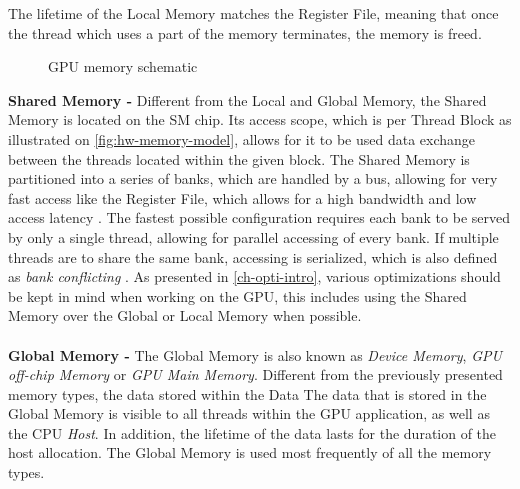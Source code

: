 The lifetime of the Local Memory matches the Register File, meaning that once the thread which uses a part of the memory terminates, the memory is freed.
\begin{figure}[H]
	\centering
	\caption{GPU memory schematic}
	\label{fig:hw-memory-schematic}
\end{figure}
\noindent \textbf{Shared Memory -} Different from the Local and Global Memory, the Shared Memory is located on the SM chip.
Its access scope, which is per Thread Block as illustrated on \cref{fig:hw-memory-model}, allows for it to be used data exchange  between the threads located within the given block.
The Shared Memory is partitioned into a series of banks, which are handled by a bus, allowing for very fast access like the Register File, which allows for a high bandwidth and low access latency \cite{Li2016}.
The fastest possible configuration requires each bank to be served by only a single thread, allowing for parallel accessing of every bank.
If multiple threads are to share the same bank, accessing is serialized, which is also defined as \textit{bank conflicting} \cite{Maitre2013}.
As presented in \cref{ch-opti-intro}, various optimizations should be kept in mind when working on the GPU, this includes using the Shared Memory over the Global or Local Memory when possible.
\\\\
\textbf{Global Memory -} The Global Memory is also known as \textit{Device Memory}, \textit{GPU off-chip Memory} or \textit{GPU Main Memory}.
Different from the previously presented memory types, the data stored within the Data The data that is stored in the Global Memory is visible to all threads within the GPU application, as well as the CPU \textit{Host}. 
In addition, the lifetime  of the data lasts for the duration of the host allocation.
The Global Memory is used most frequently of all the memory types.
